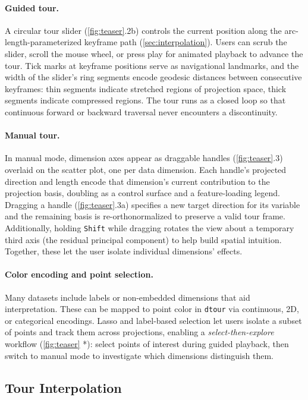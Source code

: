 \documentclass{vgtc}
\newcommand{\dtour}{\texorpdfstring{\texttt{dtour}\xspace}{dtour}}
\begin{document}
\paragraph{Guided tour.}
A circular tour slider (\autoref{fig:teaser}.2b) controls the current position along the arc-length-parameterized keyframe path (\autoref{sec:interpolation}). Users can scrub the slider, scroll the mouse wheel, or press play for animated playback to advance the tour. Tick marks at keyframe positions serve as navigational landmarks, and the width of the slider's ring segments encode geodesic distances between consecutive keyframes: thin segments indicate stretched regions of projection space, thick segments indicate compressed regions. The tour runs as a closed loop so that continuous forward or backward traversal never encounters a discontinuity.

\paragraph{Manual tour.}
In manual mode, dimension axes appear as draggable handles (\autoref{fig:teaser}.3) overlaid on the scatter plot, one per data dimension. Each handle's projected direction and length encode that dimension's current contribution to the projection basis, doubling as a control surface and a feature-loading legend. Dragging a handle (\autoref{fig:teaser}.3a) specifies a new target direction for its variable and the remaining basis is re-orthonormalized to preserve a valid tour frame. Additionally, holding \texttt{Shift} while dragging rotates the view about a temporary third axis (the residual principal component) to help build spatial intuition. Together, these let the user isolate individual dimensions' effects.

\paragraph{Color encoding and point selection.}
Many datasets include labels or non-embedded dimensions that aid interpretation. These can be mapped to point color in \dtour{} via continuous, 2D, or categorical encodings. Lasso and label-based selection let users isolate a subset of points and track them across projections, enabling a \emph{select-then-explore} workflow (\autoref{fig:teaser} *): select points of interest during guided playback, then switch to manual mode to investigate which dimensions distinguish them.

\subsection{Tour Interpolation}
\label{sec:interpolation}
\end{document}

